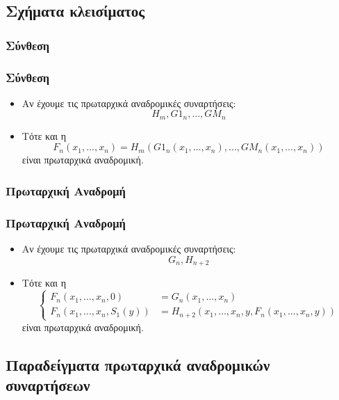 \documentclass{beamer}
\begin{document}
\subsection{Σχήματα κλεισίματος}

\subsubsection{Σύνθεση}

\begin{frame}
        \frametitle{Σύνθεση}
        \begin{itemize}
                \item Αν έχουμε τις πρωταρχικά αναδρομικές συναρτήσεις: \[H_m, G1_n, \ldots, GM_n\]
                \pause
                \item Τότε και η \[F_n(x_1,\ldots,x_n) = H_m(G1_n(x_1,\ldots,x_n),\ldots,GM_n(x_1,\ldots,x_n))\]
                είναι πρωταρχικά αναδρομική.
        \end{itemize}
\end{frame}

\subsubsection{Πρωταρχική Αναδρομή}

\begin{frame}
        \frametitle{Πρωταρχική Αναδρομή}
        \begin{itemize}
                \item Αν έχουμε τις πρωταρχικά αναδρομικές συναρτήσεις: \[G_n, H_{n+2}\]
                \pause
                \item Τότε και η 
                \[
                        \left\{
                                \begin{array}{ll}
                                        F_n(x_1,\ldots,x_n, 0) &= G_n(x_1,\ldots,x_n) \\
                                        F_n(x_1,\ldots,x_n, S_1(y)) &= H_{n+2}(x_1,\ldots,x_n, y , F_n(x_1,\ldots,x_n, y))
                                \end{array}
                        \right.
                \]
                είναι πρωταρχικά αναδρομική.
        \end{itemize}
\end{frame}

\subsection{Παραδείγματα πρωταρχικά αναδρομικών συναρτήσεων}
\end{document}
